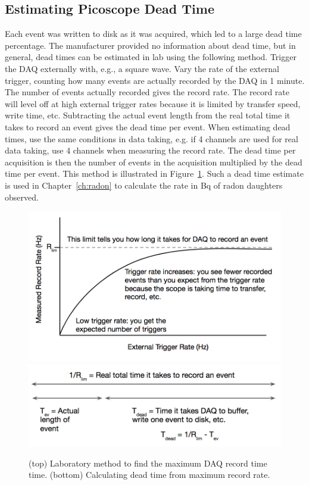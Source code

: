 \subsection{Estimating Picoscope Dead Time}
Each event was written to disk as it was acquired, which led to a large dead time percentage. The manufacturer provided no information about dead time, but in general, dead times can be estimated in lab using the following method. Trigger the DAQ externally with, e.g., a square wave. Vary the rate of the external trigger, counting how many events are actually recorded by the DAQ in 1 minute. The number of events actually recorded gives the record rate. The record rate will level off at high external trigger rates because it is limited by transfer speed, write time, etc. Subtracting the actual event length from the real total time it takes to record an event gives the dead time per event. When estimating dead times, use the same conditions in data taking, e.g. if 4 channels are used for real data taking, use 4 channels when measuring the record rate. The dead time per acquisition is then the number of events in the acquisition multiplied by the dead time per event. This method is illustrated in Figure~\ref{fig:deadtime}. Such a dead time estimate is used in Chapter~\ref{ch:radon} to calculate the rate in Bq of radon daughters observed.

 \begin{figure}[htbp]
\begin{center}
\includegraphics[width =\textwidth ]{figures/testbed/deadtime_plot.png}
\includegraphics[width =\textwidth]{figures/testbed/deadtime_math.png}
\caption{(top) Laboratory method to find the maximum \acs{DAQ} record time time. (bottom) Calculating dead time from maximum record rate.}
\label{fig:deadtime}
\end{center}
\end{figure}


